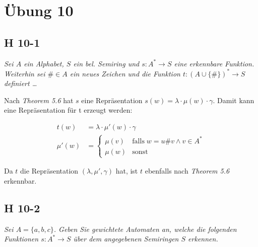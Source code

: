 \documentclass{scrartcl}
\begin{document}
\section{Übung 10}

\subsection{H 10-1}

\textsl{Sei $A$ ein Alphabet, $S$ ein bel. Semiring und $s: A^* \rightarrow S$ eine erkennbare Funktion. Weiterhin sei $\# \in A$ ein neues Zeichen und die Funktion $t: (A \cup \{\#\})^* \rightarrow S$ definiert \ldots}

Nach \emph{Theorem 5.6} hat $s$ eine Repräsentation $s(w) = \lambda\cdot\mu(w)\cdot\gamma$. Damit kann eine Repräsentation für t erzeugt werden:

\begin{align*}
    t(w) &=  \lambda\cdot\mu'(w)\cdot\gamma\\
    \mu'(w) &= \begin{cases}
        \mu(v)  &\text{falls}\; w = u\#v \land v \in A^*\\
        \mu(w)  &\text{sonst}
    \end{cases}
\end{align*}

Da $t$ die Repräsentation $(\lambda, \mu', \gamma)$ hat, ist $t$ ebenfalls nach \emph{Theorem 5.6} erkennbar.

\subsection{H 10-2}

\textsl{Sei $A = \{a,b,c\}$. Geben Sie gewichtete Automaten an, welche die folgenden Funktionen $s: A^* \rightarrow S$ über dem angegebenen Semiringen $S$ erkennen.}
\end{document}
